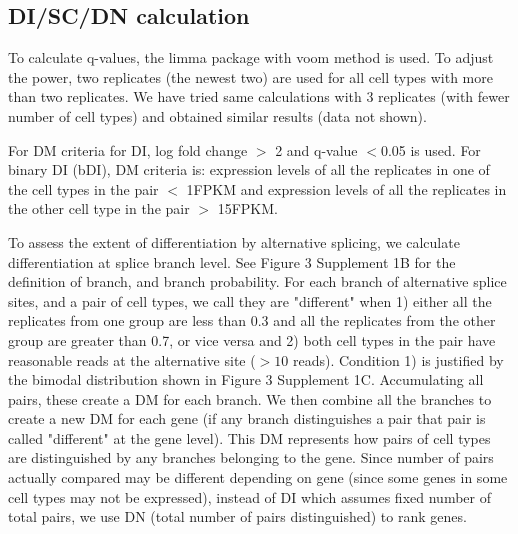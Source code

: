 \subsection{DI/SC/DN calculation}
To calculate q-values, the limma package with voom method \citep{Law_2014} is used. To adjust the power, two replicates (the newest two) are used for all cell types with more than two replicates. We have tried same calculations with 3 replicates (with fewer number of cell types) and obtained similar results (data not shown). 

For DM criteria for DI, log fold change $>$ 2 and q-value $<$0.05 is used. For binary DI (bDI), DM criteria is: expression levels of all the replicates in one of the cell types in the pair $<$ 1FPKM and expression levels of all the replicates in the other cell type in the pair $>$ 15FPKM. 

To assess the extent of differentiation by alternative splicing, we calculate differentiation at splice branch level. See Figure 3 Supplement 1B for the definition of branch, and branch probability. For each branch of alternative splice sites, and a pair of cell types, we call they are "different" when 1) either all the replicates from one group are less than 0.3 and all the replicates from the other group are greater than 0.7, or vice versa and 2) both cell types in the pair have reasonable reads at the alternative site ($>10$ reads). Condition 1) is justified by the bimodal distribution shown in Figure 3 Supplement 1C. Accumulating all pairs, these create a DM for each branch. We then combine all the branches to create a new DM for each gene (if any branch distinguishes a pair that pair is called "different" at the gene level). This DM represents how pairs of cell types are distinguished by any branches belonging to the gene. Since number of pairs actually compared may be different depending on gene (since some genes in some cell types may not be expressed), instead of DI which assumes fixed number of total pairs, we use DN (total number of pairs distinguished) to rank genes.

